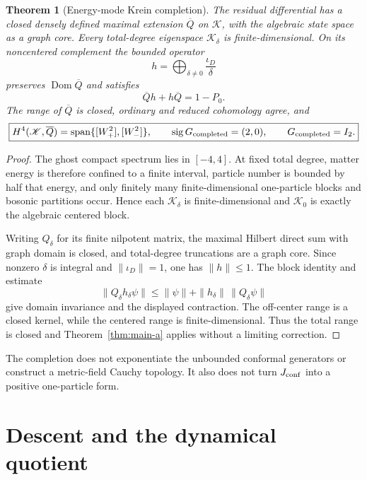 \documentclass[11pt]{article}
\newtheorem{theorem}{Theorem}[section]
\theoremstyle{remark}
\newcommand{\K}{\mathscr K}
\begin{document}
\begin{theorem}[Energy-mode Krein completion]\label{thm:completion-a}
The residual differential has a closed densely defined maximal extension
$\overline Q$ on $\K$, with the algebraic state space as a graph core.  Every
total-degree eigenspace $\K_\delta$ is finite-dimensional.  On its
noncentered complement the bounded operator
\begin{equation}
 h=\bigoplus_{\delta\ne0}\frac{\iota_D}{\delta}
\end{equation}
preserves $\operatorname{Dom}\overline Q$ and satisfies
\begin{equation}
 \overline Qh+h\overline Q=1-P_0.
\end{equation}
The range of $\overline Q$ is closed, ordinary and reduced cohomology agree,
and
\begin{equation}\label{eq:completed-a}
 \boxed{
 H^4(\K,\overline Q)
 =\operatorname{span}\{[W_+^2],[W_-^2]\},
 \qquad \operatorname{sig}G_{\rm completed}=(2,0),
 \qquad G_{\rm completed}=I_2.}
\end{equation}
\end{theorem}

\begin{proof}
The ghost compact spectrum lies in $[-4,4]$.  At fixed total degree, matter
energy is therefore confined to a finite interval, particle number is
bounded by half that energy, and only finitely many finite-dimensional
one-particle blocks and bosonic partitions occur.  Hence each $\K_\delta$ is
finite-dimensional and $\K_0$ is exactly the algebraic centered block.

Writing $Q_\delta$ for its finite nilpotent matrix, the maximal Hilbert direct
sum with graph domain is closed, and total-degree truncations are a graph
core.  Since nonzero $\delta$ is integral and $\|\iota_D\|=1$, one has
$\|h\|\le1$.  The block identity and estimate
\[
 \|Q_\delta h_\delta\psi\|
 \le\|\psi\|+\|h_\delta\|\,\|Q_\delta\psi\|
\]
give domain invariance and the displayed contraction.  The off-center range
is a closed kernel, while the centered range is finite-dimensional.  Thus
the total range is closed and Theorem~\ref{thm:main-a} applies without a
limiting correction.
\end{proof}

The completion does not exponentiate the unbounded conformal generators or
construct a metric-field Cauchy topology.  It also does not turn
$J_{\rm conf}$ into a positive one-particle form.

\section{Descent and the dynamical quotient}
\end{document}
